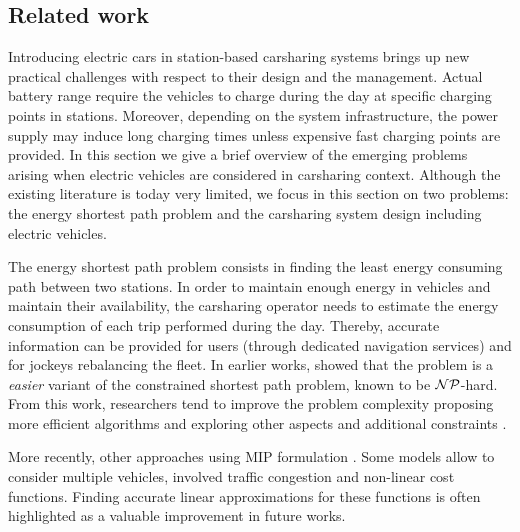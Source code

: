 \begin{bibunit}[ieeetr]
\subsection{Related work}

Introducing electric cars in station-based carsharing systems brings up new practical challenges with respect to their design and the management.
Actual battery range require the vehicles to charge during the day at specific charging points in stations.
Moreover, depending on the system infrastructure, the power supply may induce long charging times unless expensive fast charging points are provided.
In this section we give a brief overview of the emerging problems arising when electric vehicles are considered in carsharing context.
Although the existing literature is today very limited, we focus in this section on two problems: the energy shortest path problem and the carsharing system design including electric vehicles. 


\medskip
The energy shortest path problem consists in finding the least energy consuming path between two stations.
In order to maintain enough energy in vehicles and maintain their availability, the carsharing operator needs to estimate the energy consumption of each trip performed during the day.
Thereby, accurate information can be provided for users (through dedicated navigation services) and for jockeys rebalancing the fleet.
In earlier works, \cite{artmeier_optimal_2010} showed that the problem is a \emph{easier} variant of the constrained shortest path problem, known to be ${\cal NP}$-hard.
From this work, researchers tend to improve the problem complexity proposing more efficient algorithms and exploring other aspects and additional constraints \cite{eisner_optimal_2011, sachenbacher_efficient_2011}.

More recently, other approaches using MIP formulation \cite{touati_combinatorial_2012, wang_energy_2014, arslan_minimum_2015}.
Some models allow to consider multiple vehicles, involved traffic congestion and non-linear cost functions.
Finding accurate linear approximations for these functions is often highlighted as a valuable improvement in future works.



\end{bibunit}

